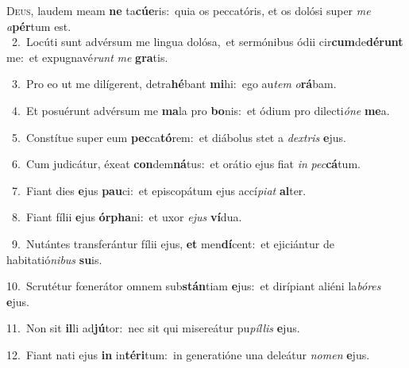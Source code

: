 \lettrine{\initial\textcolor{\initialcolor}{D}}{eus,} laudem meam \textbf{ne} ta\-\textbf{cú}\-\textbf{e}ris:~\star quia os peccatóris, et os dolósi super \textit{me} \textit{a}\-\textbf{pér}tum est.\\
{\numbfont\textcolor{\numbcolor}{~2.}}~Locúti sunt advérsum me lingua dolósa,~\dagger et sermónibus ódii cir\-\textbf{cum}\-de\-\textbf{dé}\-\textbf{runt} me:~\star et expugnavé\textit{runt} \textit{me} \textbf{gra}\-tis.\par
{\numbfont\textcolor{\numbcolor}{~3.}}~Pro eo ut me dilígerent, detra\-\textbf{hé}\-bant \textbf{mi}\-hi:~\star ego au\textit{tem} \textit{o}\-\textbf{rá}bam.\par
{\numbfont\textcolor{\numbcolor}{~4.}}~Et posuérunt advérsum me \textbf{ma}\-la pro \textbf{bo}\-nis:~\star et ódium pro dilecti\-\textit{ó}\-\textit{ne} \textbf{me}\-a.\par
{\numbfont\textcolor{\numbcolor}{~5.}}~Constítue super eum \textbf{pec}\-ca\-\textbf{tó}\-rem:~\star et diábolus stet a \textit{dex}\-\textit{tris} \textbf{e}\-jus.\par
{\numbfont\textcolor{\numbcolor}{~6.}}~Cum judicátur, éxeat \textbf{con}\-dem\-\textbf{ná}\-tus:~\star et orátio ejus fiat \textit{in} \textit{pec}\-\textbf{cá}tum.\par
{\numbfont\textcolor{\numbcolor}{~7.}}~Fiant dies \textbf{e}\-jus \textbf{pau}\-ci:~\star et episcopátum ejus accí\-\textit{pi}\-\textit{at} \textbf{al}\-ter.\par
{\numbfont\textcolor{\numbcolor}{~8.}}~Fiant fílii \textbf{e}\-jus \textbf{ór}\-\textbf{pha}ni:~\star et uxor \textit{e}\-\textit{jus} \textbf{ví}\-dua.\par
{\numbfont\textcolor{\numbcolor}{~9.}}~Nutántes transferántur fílii ejus, \textbf{et} men\-\textbf{dí}\-cent:~\star et ejiciántur de habitatió\-\textit{ni}\-\textit{bus} \textbf{su}\-is.\par
{\numbfont\textcolor{\numbcolor}{10.}}~Scrutétur fœnerátor omnem sub\-\textbf{stán}\-tiam \textbf{e}\-jus:~\star et dirípiant aliéni la\-\textit{bó}\-\textit{res} \textbf{e}\-jus.\par
{\numbfont\textcolor{\numbcolor}{11.}}~Non sit \textbf{il}\-li ad\-\textbf{jú}\-tor:~\star nec sit qui misereátur pu\-\textit{píl}\-\textit{lis} \textbf{e}\-jus.\par
{\numbfont\textcolor{\numbcolor}{12.}}~Fiant nati ejus \textbf{in} in\-\textbf{tér}\-\textbf{i}tum:~\star in generatióne una deleátur \textit{no}\-\textit{men} \textbf{e}\-jus.\par

